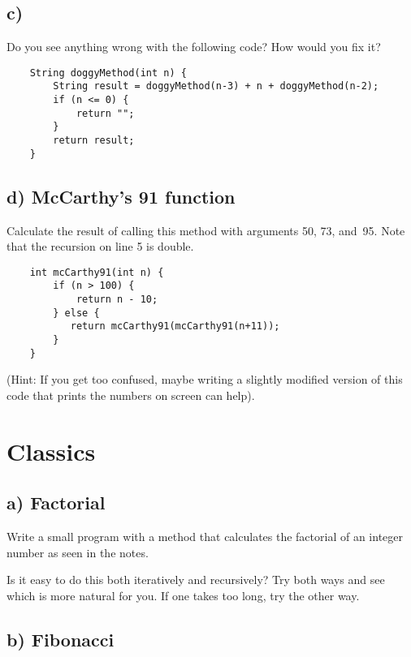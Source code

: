 \documentclass{article}
\begin{document}
\subsection*{c)}
\label{sec:b-3}

Do you see anything wrong with the following code? How would you fix it?

\begin{verbatim}
    String doggyMethod(int n) {
        String result = doggyMethod(n-3) + n + doggyMethod(n-2);
        if (n <= 0) {
            return "";
        }
        return result;
    }
\end{verbatim}


\subsection*{d) McCarthy's 91 function}
\label{sec:c}

Calculate the result of calling this method with arguments 50, 73, 
and~95. Note that the recursion on line 5 is double. 

\begin{verbatim}
    int mcCarthy91(int n) {
        if (n > 100) {
            return n - 10;
        } else {
           return mcCarthy91(mcCarthy91(n+11));
        }
    }
\end{verbatim}

(Hint: If you get too confused, maybe writing a slightly modified
version of this code that prints the numbers on screen can help).

\section{Classics}

\subsection{a) Factorial }

Write a small program with a method that calculates the factorial of an
integer number as seen in the notes. 

Is it easy to do this both iteratively and recursively? Try both ways
and see which is more natural for you. If one takes too long, try the
other way. 

\subsection{b) Fibonacci }
\end{document}
